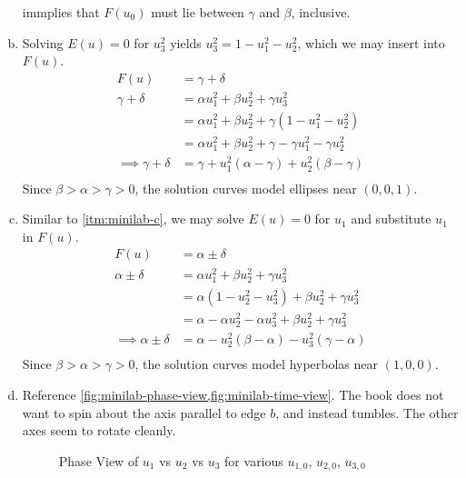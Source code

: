 \documentclass[12pt]{article}
\begin{document}
\begin{enumerate}[(a)]
  immplies that $F(u_0)$ must lie between $\gamma$ and $\beta$, inclusive.
\item \label{itm:minilab-c} Solving $E(u)=0$ for $u_3^2$ yields $u_3^2=1-u_1^2-u_2^2$, which we may
  insert into $F(u)$.
  \begin{equation*}
    \begin{aligned}
      F(u) &= \gamma + \delta \\
      \gamma + \delta &= \alpha u_1^2+\beta u_2^2+\gamma u_3^2 \\
      &= \alpha u_1^2+\beta u_2^2+\gamma (1-u_1^2-u_2^2) \\
      &= \alpha u_1^2+\beta u_2^2+\gamma - \gamma u_1^2 - \gamma u_2^2 \\
      \implies \gamma + \delta &= \gamma + u_1^2(\alpha-\gamma) + u_2^2(\beta-\gamma) \\
    \end{aligned}
  \end{equation*}
  Since $\beta>\alpha>\gamma>0$, the solution curves model ellipses near $(0,0,1)$.
\item Similar to \cref{itm:minilab-c}, we may solve $E(u)=0$ for $u_1$ and
  substitute $u_1$ in $F(u)$.
  \begin{equation*}
    \begin{aligned}
      F(u) &= \alpha \pm \delta \\
      \alpha \pm \delta &= \alpha u_1^2+\beta u_2^2+\gamma u_3^2 \\
      &= \alpha(1-u_2^2-u_3^2)+\beta u_2^2 + \gamma u_3^2 \\
      &= \alpha-\alpha u_2^2-\alpha u_3^2+\beta u_2^2 + \gamma u_3^2 \\
      \implies \alpha \pm \delta &= \alpha - u_2^2(\beta-\alpha) - u_3^2(\gamma-\alpha) \\
    \end{aligned}
  \end{equation*}
  Since $\beta>\alpha>\gamma>0$, the solution curves model hyperbolas near
  $(1,0,0)$.
\item Reference \cref{fig:minilab-phase-view,fig:minilab-time-view}. The book
  does not want to spin about the axis parallel to edge $b$, and instead
  tumbles. The other axes seem to rotate cleanly.

  \begin{figure}
    \centering
    \caption{Phase View of $u_1$ vs $u_2$ vs $u_3$ for various $u_{1,0}$, $u_{2,0}$, $u_{3,0}$}
    \label{fig:minilab-phase-view}
  \end{figure}


\end{enumerate}
\end{document}
